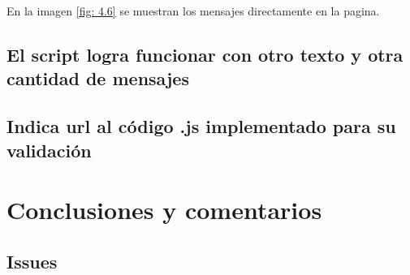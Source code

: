 \documentclass[letter,12pt]{article}
\begin{document}
En la imagen \ref{fig: 4.6} se muestran los mensajes directamente en la pagina.
\subsection{El script logra funcionar con otro texto y otra cantidad de mensajes}

\subsection{Indica url al código .js implementado para su validación}



\section*{Conclusiones y comentarios}

\subsection*{Issues}
\end{document}
